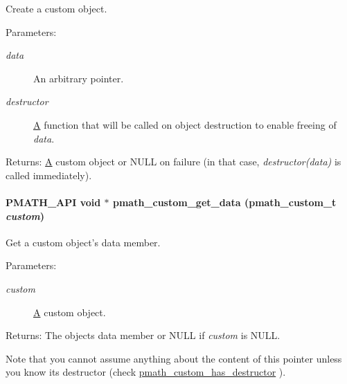 Create a custom object. 

\begin{Desc}
\item[Parameters:]
\begin{description}
\item[{\em data}]An arbitrary pointer. \item[{\em destructor}]\hyperlink{class_a}{A} function that will be called on object destruction to enable freeing of {\em data\/}. \end{description}
\end{Desc}
\begin{Desc}
\item[Returns:]\hyperlink{class_a}{A} custom object or NULL on failure (in that case, {\em destructor(data)\/} is called immediately). \end{Desc}
\hypertarget{group__custom_ge7902883fc5e8f88b60410950564fdcd}{
\paragraph[{pmath\_\-custom\_\-get\_\-data}]{\setlength{\rightskip}{0pt plus 5cm}PMATH\_\-API void $\ast$ pmath\_\-custom\_\-get\_\-data ({\bf pmath\_\-custom\_\-t} {\em custom})}\hfill}
\label{group__custom_ge7902883fc5e8f88b60410950564fdcd}


Get a custom object's data member. 

\begin{Desc}
\item[Parameters:]
\begin{description}
\item[{\em custom}]\hyperlink{class_a}{A} custom object. \end{description}
\end{Desc}
\begin{Desc}
\item[Returns:]The objects data member or NULL if {\em custom\/} is NULL.\end{Desc}
Note that you cannot assume anything about the content of this pointer unless you know its destructor (check \hyperlink{group__custom_g0847bc90fa81ddfdf0f3ff84d32947cf}{pmath\_\-custom\_\-has\_\-destructor} ).

